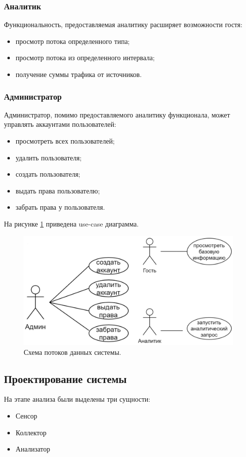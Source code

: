 \subsubsection{Аналитик}
Функциональность, предоставляемая аналитику расширяет возможности гостя:
\begin{itemize}
	\item[1)] просмотр потока определенного типа;
	\item[2)] просмотр потока из определенного интервала;
	\item[3)] получение суммы трафика от источников.
\end{itemize}
\subsubsection{Администратор}
Администратор, помимо предоставляемого аналитику функционала, может управлять аккаунтами пользователей:
\begin{itemize}
	\item[1)] просмотреть всех пользователей;
	\item[2)] удалить пользователя;
	\item[3)] создать пользователя;
	\item[4)] выдать права пользователю;
	\item[5)] забрать права у пользователя.
\end{itemize}
\indent На рисунке \ref{usecase} приведена use-case диаграмма.
\begin{figure}[H]
	\centering
	\includegraphics[scale=0.55]{usecase.png}
	\caption{Схема потоков данных системы.}
	\label{usecase}
\end{figure}

\subsection{Проектирование системы}
На этапе анализа были выделены три сущности:
\begin{itemize}
\item Сенсор
\item Коллектор
\item Анализатор
\end{itemize}

